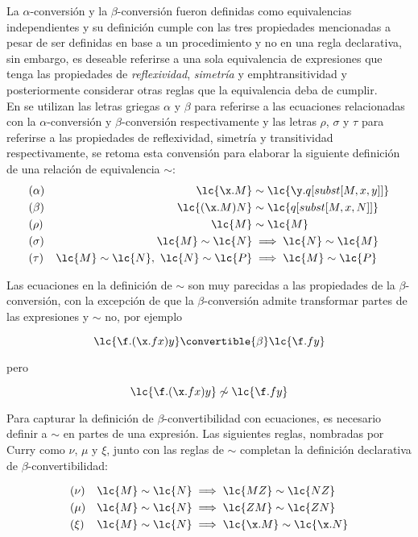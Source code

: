 La \(\alpha\)-conversión y la \(\beta\)-conversión fueron definidas como
equivalencias independientes y su definición cumple con las tres propiedades
mencionadas a pesar de ser definidas en base a un procedimiento y no en una
regla declarativa, sin embargo, es deseable referirse a una sola equivalencia de
expresiones que tenga las propiedades de \emph{reflexividad}, \emph{simetría} y
emph{transitividad} y posteriormente considerar otras reglas que la equivalencia
deba de cumplir. \\

En \cite{Curry:CombinatoryLogicI} se utilizan las letras griegas \(\alpha\) y
\(\beta\) para referirse a las ecuaciones relacionadas con la
\(\alpha\)-conversión y \(\beta\)-conversión respectivamente y las letras
\(\rho\), \(\sigma\) y \(\tau\) para referirse a las propiedades de
reflexividad, simetría y transitividad respectivamente, se retoma esta convensión
para elaborar la siguiente definición de una relación de equivalencia \(\sim\): \\

\begin{align*}
  &(\alpha) &\lc{\x.M} &\sim \lc{\y.q[subst[M,x,y]]} \\
  &(\beta)  &\lc{(\x.M)N} &\sim \lc{q[subst[M,x,N]]} \\
  &(\rho)   &\lc{M} &\sim \lc{M} \\
  &(\sigma) &\lc{M} \sim \lc{N} &\implies \lc{N} \sim \lc{M}\\
  &(\tau)   &\lc{M} \sim \lc{N},\ \lc{N} \sim \lc{P} &\implies \lc{M} \sim \lc{P}
\end{align*}

Las ecuaciones en la definición de \(\sim\) son muy parecidas a las propiedades
de la \(\beta\)-conversión, con la excepción de que la \(\beta\)-conversión
admite transformar partes de las expresiones y \(\sim\) no, por ejemplo

\[\lc{\f.(\x.f x)y} \convertible{\beta} \lc{\f.f y}\]

pero

\[\lc{\f.(\x.f x)y} \not\sim \lc{\f.f y}\]

Para capturar la definición de \(\beta\)-convertibilidad con ecuaciones, es
necesario definir a \(\sim\) en partes de una expresión. Las siguientes reglas,
nombradas por Curry como \(\nu\), \(\mu\) y \(\xi\), junto con las reglas de
\(\sim\) completan la definición declarativa de \(\beta\)-convertibilidad:

\begin{align*}
  &(\nu)  &\lc{M} \sim \lc{N} &\implies \lc{M Z} \sim \lc{N Z} \\
  &(\mu)  &\lc{M} \sim \lc{N} &\implies \lc{Z M} \sim \lc{Z N} \\
  &(\xi)  &\lc{M} \sim \lc{N} &\implies \lc{\x.M} \sim \lc{\x.N}
\end{align*}

